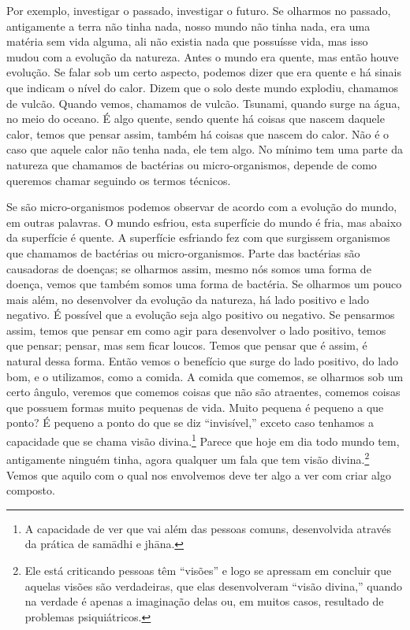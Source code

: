 Por exemplo, investigar o passado, investigar o futuro. Se olharmos
no passado, antigamente a terra não tinha nada, nosso mundo não tinha
nada, era uma matéria sem vida alguma, ali não existia nada que
possuísse vida, mas isso mudou com a evolução da natureza. Antes o
mundo era quente, mas então houve evolução. Se falar sob um certo
aspecto, podemos dizer que era quente e há sinais que indicam o nível
do calor. Dizem que o solo deste mundo explodiu, chamamos de vulcão.
Quando vemos, chamamos de vulcão. Tsunami, quando surge na água, no
meio do oceano. É algo quente, sendo quente há coisas que nascem
daquele calor, temos que pensar assim, também há coisas que nascem do
calor. Não é o caso que aquele calor não tenha nada, ele tem algo. No
mínimo tem uma parte da natureza que chamamos de bactérias ou
micro-organismos, depende de como queremos chamar
seguindo os termos técnicos. 

Se são micro-organismos podemos observar de acordo com a evolução do
mundo, em outras palavras. O mundo esfriou, esta superfície do mundo é
fria, mas abaixo da superfície é quente. A superfície esfriando fez com
que surgissem organismos que chamamos de bactérias ou micro-organismos.
Parte das bactérias são causadoras de doenças; se olharmos assim, mesmo
nós somos uma forma de doença, vemos que também somos uma forma de
bactéria. Se olharmos um pouco mais além, no desenvolver da evolução da
natureza, há lado positivo e lado negativo. É possível que a evolução
seja algo positivo ou negativo. Se pensarmos
assim, temos que pensar em como agir para desenvolver o lado positivo,
temos que pensar; pensar, mas sem ficar loucos. Temos que pensar que é
assim, é natural dessa forma. Então vemos o benefício que surge do lado
positivo, do lado bom, e o utilizamos, como a comida. A comida que
comemos, se olharmos sob um certo ângulo, veremos que comemos coisas
que não são atraentes, comemos coisas que possuem formas muito pequenas
de vida. Muito pequena é pequeno a que ponto? É pequeno a ponto do que
se diz “invisível,” exceto caso tenhamos a capacidade que se chama
visão divina.\footnote{A capacidade de ver que vai além das pessoas
comuns, desenvolvida através da prática de samādhi e jhāna.}
Parece que hoje em dia todo mundo tem, antigamente ninguém tinha, agora
qualquer um fala que tem visão divina.\footnote{Ele está criticando
pessoas têm “visões” e logo se apressam em concluir que aquelas visões
são verdadeiras, que elas desenvolveram “visão divina,” quando na
verdade é apenas a imaginação delas ou, em muitos casos, resultado de
problemas psiquiátricos.} Vemos que aquilo com o qual nos envolvemos
deve ter algo a ver com criar algo composto.


